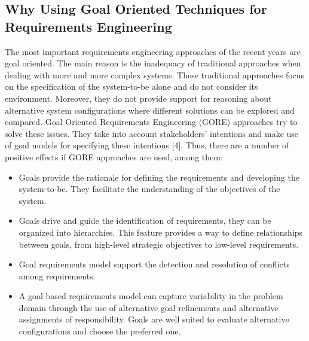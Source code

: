 \documentclass[10pt, conference, compsocconf]{IEEEtran}
\def\kaos{\textsc{Kaos}}
\begin{document}
\subsection{Why Using Goal Oriented Techniques for Requirements Engineering}

The most important requirements engineering approaches of the recent years are goal oriented. The main reason is the inadequacy of traditional approaches when dealing with more and more complex systems. These traditional approaches focus on the specification of the system-to-be alone and do not consider its environment. Moreover, they do not provide support for reasoning about alternative system configurations where different solutions can be explored and compared. Goal Oriented Requirements Engineering (GORE) approaches try to solve these issues. They take into account stakeholders' intentions and make use of goal models for specifying these intentions [4]. Thus, there are a number of positive effects if GORE approaches are used, among them:

\begin{itemize}
\item Goals provide the rationale for defining the requirements and developing the system-to-be. They facilitate the understanding of the objectives of the system.
\item Goals drive and guide the identification of requirements, they can be organized into hierarchies. This feature provides a way to define relationships between goals, from high-level strategic objectives to low-level requirements.
\item Goal requirements model support the detection and resolution of conflicts among requirements.
\item A goal based requirements model can capture variability in the problem domain through the use of alternative goal refinements and alternative assignments of responsibility. Goals are well suited to evaluate alternative configurations and choose the preferred one.
\end{itemize}

\end{document}
